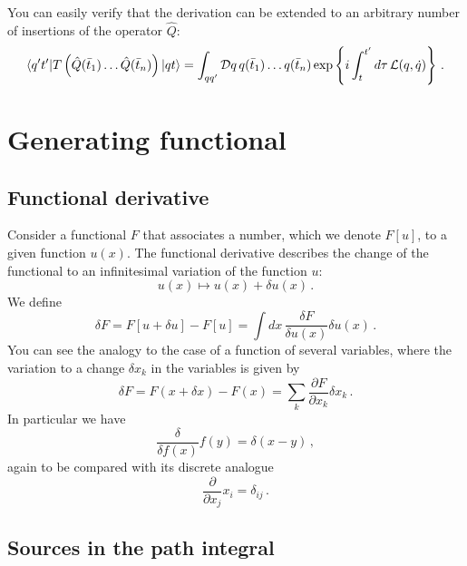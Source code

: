You can easily verify that the derivation can be extended to
an arbitrary number of insertions of the operator $\hat{Q}$:
\begin{align}
\label{eq:TOrderNPt}
\langle q't' | T\left(\hat{Q}(\bar{t}_1) \ldots \hat{Q}(\bar{t}_n)
  \right)| qt \rangle = 
  \int_{qq'} \mathcal{D}q\, q(\bar{t}_1) \ldots q(\bar{t}_n) 
  \exp \left\{
  i \int_t^{t'} d\tau\, \mathcal{L}(q,\dot{q})
  \right\}\, .
\end{align}

\section{Generating functional}
\label{sec:gener-funct}

\subsection{Functional derivative}
\label{sec:funct-deriv}

Consider a functional $F$ that associates a number, which we denote
$F[u]$, to a given function $u(x)$. The functional derivative
describes the change of the functional to an infinitesimal variation
of the function $u$: 
\[
  u(x) \mapsto u(x) + \delta u(x)\, .
\]
We define
\begin{equation}
  \label{eq:FuncDer}
  \delta F = F[u+\delta u] - F[u] = \int dx\, \frac{\delta F}{\delta
    u(x)} \delta u(x)\, .
\end{equation}
You can see the analogy to the case of a function of several
variables, where the variation to a change $\delta x_k$ in the
variables is given by
\begin{equation}
  \label{eq:NormDer}
  \delta F = F(x+\delta x) - F(x) = \sum_k \frac{\partial F}{\partial
    x_k} \delta x_k\, .
\end{equation}
In particular we have
\begin{equation}
  \label{eq:DiracDelta}
  \frac{\delta}{\delta f(x)} f(y) = \delta(x-y)\, , 
\end{equation}
again to be compared with its discrete analogue
\begin{equation}
  \label{eq:KroneckerDelta}
  \frac{\partial}{\partial x_j} x_i = \delta_{ij}\, .
\end{equation}

\subsection{Sources in the path integral}
\label{sec:sourc-path-integr}

